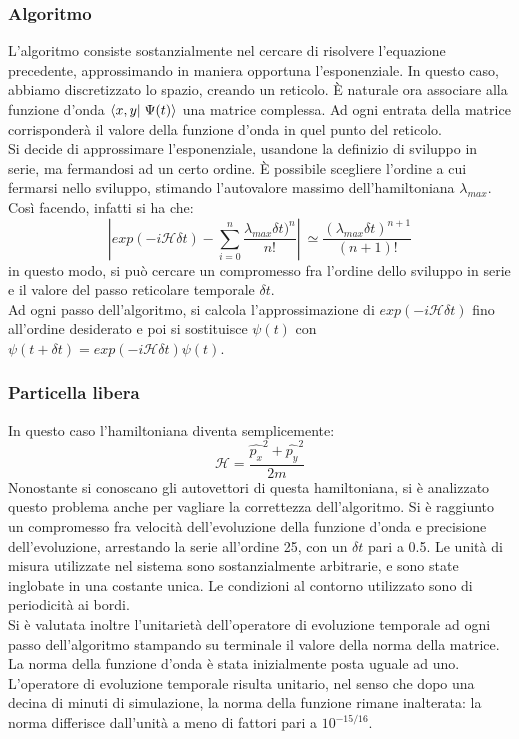 \subsubsection{Algoritmo}
L'algoritmo consiste sostanzialmente nel cercare di risolvere l'equazione precedente, approssimando in maniera opportuna l'esponenziale.
In questo caso, abbiamo discretizzato lo spazio, creando un reticolo. È naturale ora associare alla funzione d'onda $ \braket{x,y}{\Psi(t)}$ una
matrice complessa. Ad ogni entrata della matrice corrisponderà il valore della funzione d'onda in quel punto del reticolo.\\
Si decide di approssimare l'esponenziale, usandone la definizio di sviluppo in serie, ma fermandosi ad un certo ordine. È possibile scegliere l'ordine a cui fermarsi nello sviluppo,
stimando l'autovalore massimo dell'hamiltoniana $ \lambda_{max}$. Così facendo, infatti si ha che:
$$
\left| exp \left( - i \mathcal{H} \delta t \right) - \sum_{i=0}^n \frac{\lambda_{max} \delta t)^{n}}{n!} \right| \ \simeq \frac{\left(\lambda_{max} \delta t\right)^{n+1}}{(n+1)!} 
$$
in questo modo, si può cercare un compromesso fra l'ordine dello sviluppo in serie e il valore del passo reticolare temporale $\delta t$.\\
Ad ogni passo dell'algoritmo, si calcola l'approssimazione di $ exp \left( -i \mathcal{H} \delta t \right)$ fino all'ordine desiderato e poi si
sostituisce $ \psi(t)$ con $\psi(t+\delta t) = exp \left( -i \mathcal{H} \delta t \right) \psi(t)$.
\subsubsection{Particella libera}
In questo caso l'hamiltoniana diventa semplicemente:
$$
\mathcal{H} = \frac{\hat{p_x}^2+\hat{p_y}^2}{2m}
$$
Nonostante si conoscano gli autovettori di questa hamiltoniana, si è analizzato questo problema anche per vagliare la correttezza dell'algoritmo.
Si è raggiunto un compromesso fra velocità dell'evoluzione della funzione d'onda e precisione dell'evoluzione, arrestando la serie all'ordine 25, con un $\delta t$ pari a 0.5.
Le unità di misura utilizzate nel sistema sono sostanzialmente arbitrarie, e sono state inglobate in una costante unica.
Le condizioni al contorno utilizzato sono di periodicità ai bordi.\\
Si è valutata inoltre l'unitarietà dell'operatore di evoluzione temporale ad ogni passo dell'algoritmo stampando su terminale il valore della norma
della matrice. La norma della funzione d'onda è stata inizialmente posta uguale ad uno. L'operatore di evoluzione temporale risulta unitario, nel senso che dopo una decina di minuti di simulazione,
la norma della funzione rimane inalterata: la norma differisce dall'unità a meno di fattori pari a $10^{-15/16}$. 

